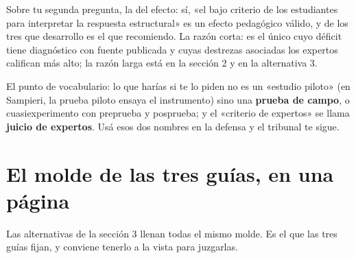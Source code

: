 \documentclass[11pt,a4paper]{article}
\begin{document}
Sobre tu segunda pregunta, la del efecto: sí, «el bajo criterio de los estudiantes para interpretar la respuesta estructural» es un efecto pedagógico válido, y de los tres que desarrollo es el que recomiendo. La razón corta: es el único cuyo déficit tiene diagnóstico con fuente publicada y cuyas destrezas asociadas los expertos califican más alto; la razón larga está en la sección 2 y en la alternativa 3.

El punto de vocabulario: lo que harías si te lo piden no es un «estudio piloto» (en Sampieri, la prueba piloto ensaya el instrumento) sino una \textbf{prueba de campo}, o cuasiexperimento con preprueba y posprueba; y el «criterio de expertos» se llama \textbf{juicio de expertos}. Usá esos dos nombres en la defensa y el tribunal te sigue.

\section{El molde de las tres guías, en una página}

Las alternativas de la sección 3 llenan todas el mismo molde. Es el que las tres guías fijan, y conviene tenerlo a la vista para juzgarlas.
\end{document}
